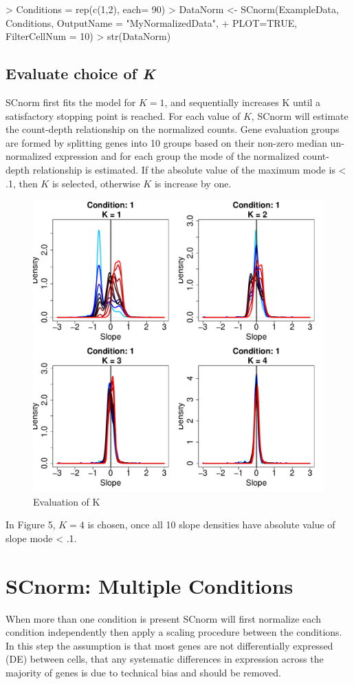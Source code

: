 \documentclass{article}
\begin{document}
\begin{Schunk}
\begin{Sinput}
> Conditions = rep(c(1,2), each= 90)
> DataNorm <- SCnorm(ExampleData, Conditions, OutputName = "MyNormalizedData",
+                      PLOT=TRUE, FilterCellNum = 10)
> str(DataNorm)
\end{Sinput}
\end{Schunk}
  



\subsection{Evaluate choice of \textit{K}}
\label{sec:NormalizationK}

SCnorm first fits the model for $K = 1$, and sequentially increases K until a satisfactory stopping point is reached. For each value of $K$, SCnorm will estimate the count-depth relationship on the normalized counts. Gene evaluation groups are formed by splitting genes into 10 groups based on their non-zero median un-normalized expression and for each group the mode of the normalized count-depth relationship is estimated. If the absolute value of the maximum mode is < .1, then $K$ is selected, otherwise $K$ is increase by one.


\begin{figure}[h!]
\centering
\includegraphics[width=.5\textwidth]{MyNormalizedData_k_evaluation.pdf}
\caption{Evaluation of K}
\end{figure}



In Figure 5, $K = 4$ is chosen, once all 10 slope densities have absolute value of slope mode < .1.


\section{SCnorm: Multiple Conditions}
When more than one condition is present SCnorm will first normalize each condition independently then apply a scaling procedure between the conditions. In this step the assumption is that most genes are not differentially expressed (DE) between cells, that any systematic differences in expression across the majority of genes is due to technical bias and should be removed.
\end{document}
